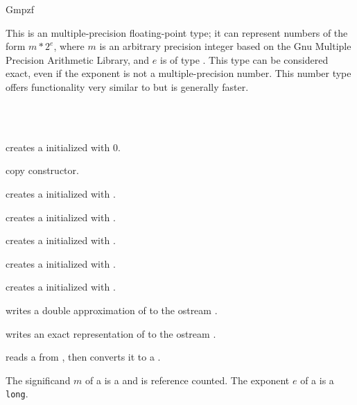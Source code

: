 \begin{ccRefClass} {Gmpzf}
\label{Gmpzf}

\ccDefinition

This is an multiple-precision floating-point type; it can represent
numbers of the form $m*2^e$, where $m$ is an arbitrary precision integer
based on the {\sc Gnu} Multiple Precision Arithmetic Library, and $e$
is of type . This type can be considered exact, even if the
exponent is not a multiple-precision number.  This number type offers
functionality very similar to  but is generally faster.


\ccIsModel
{}\\
\\

\ccCreation
{}

             {creates a  initialized with $0$.}

\ccHidden {}
            {copy constructor.}

            {creates a  initialized with .}

            {creates a  initialized with .}

            {creates a  initialized with .}

            {creates a  initialized with .}

            {creates a  initialized with .}
\ccOperations

{writes a double approximation of  to the ostream .}

{writes an exact representation of  to the ostream .}

{reads a  from , then converts it to a .}

\ccImplementation
The significand $m$ of a  is a  and is reference
counted. The exponent $e$ of a  is a \verb=long=.

\end{ccRefClass} 
